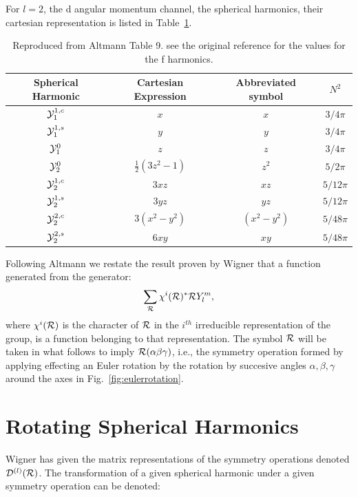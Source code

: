 For $l=2$, the d angular momentum channel, the spherical harmonics, their
cartesian representation is listed in Table~\ref{tab:shcart}.
%
\begin{table}
\begin{tabular}{cccc}
Spherical Harmonic & Cartesian Expression   & Abbreviated symbol     & $N^{2}$ \\
\hline
$\mathcal{Y}^{1,c}_{1}$     &  $x$                     & $x$                  &  $3/4\pi$  \\
$\mathcal{Y}^{1,s}_{1}$     &  $y$                     & $y$                  &  $3/4\pi$  \\
$\mathcal{Y}^{0}_{1}$       &  $z$                     & $z$                  &  $3/4\pi$  \\
$\mathcal{Y}^{0}_{2}$       & $\frac{1}{2}(3z^{2}-1)$  & $z^{2}$              &  $5/2\pi$ \\
$\mathcal{Y}^{1,c}_{2}$     & $3xz$                    & $xz$                 &  $5/12\pi$ \\
$\mathcal{Y}^{1,s}_{2}$     & $3yz$                    & $yz$                 &  $5/12\pi$ \\
$\mathcal{Y}^{2,c}_{2}$     & $3(x^2-y^2)$             & $(x^{2}-y^{2})$      &  $5/48\pi$ \\
$\mathcal{Y}^{2,s}_{2}$     & $6xy$                    & $xy$                 &  $5/48\pi$ \\
\end{tabular}
\caption{Reproduced from Altmann Table 9. \cite{altmann63a} see the original 
reference for the values for the f harmonics.\label{tab:shcart}}
\end{table}

Following Altmann\cite{altmann57} we restate the result 
proven by Wigner that a function generated from the generator:
%
\begin{equation}
\sum_{\mathcal{R}}\chi^{i}({\mathcal{R}})^{*}{\mathcal{R}} Y_{l}^{m},
\end{equation}
%
where $\chi^{i}({\mathcal{R}})$ is the character of ${\mathcal{R}}$ in 
the $i^{th}$ irreducible representation of
the group, is a function belonging to that representation. 
The symbol ${\mathcal{R}}$ will be taken in what follows to imply
${\mathcal{R}}(\alpha\beta\gamma)$, i.e., the symmetry operation
formed by applying effecting an Euler rotation by the rotation
by succesive angles $\alpha,\beta,\gamma$ around the axes in
Fig.~\ref{fig:eulerrotation}.

\section{Rotating Spherical Harmonics}
Wigner has given the matrix representations of the symmetry operations denoted 
$\mathcal{D}^{(l)}({\mathcal{R}})$. The transformation of a given spherical harmonic under 
a given symmetry operation can be denoted:

